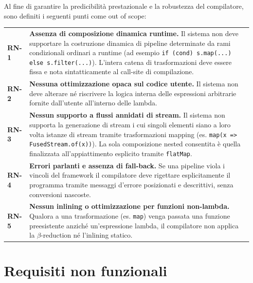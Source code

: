 \documentclass[a4paper,11pt]{report}
\theoremstyle{definition}
\begin{document}
Al fine di garantire la predicibilità prestazionale e la robustezza del compilatore, sono definiti i seguenti punti come out of scope:

\begin{longtable}{@{}p{}p{}@{}}
  \textbf{RN-1} &
  \textbf{Assenza di composizione dinamica runtime.}
  Il sistema non deve supportare la costruzione dinamica di pipeline determinate da rami condizionali ordinari a runtime (ad esempio \texttt{if (cond) s.map(...) else s.filter(...)}). L'intera catena di trasformazioni deve essere fissa e nota sintatticamente al call-site di compilazione.
  \\[0.5em]

  \textbf{RN-2} &
  \textbf{Nessuna ottimizzazione opaca sul codice utente.}
  Il sistema non deve alterare né riscrivere la logica interna delle espressioni arbitrarie fornite dall'utente all'interno delle lambda.
  \\[0.5em]

  \textbf{RN-3} &
  \textbf{Nessun supporto a flussi annidati di stream.}
  Il sistema non supporta la generazione di stream i cui singoli elementi siano a loro volta istanze di stream tramite trasformazioni mapping (es. \texttt{map(x => FusedStream.of(x))}). La sola composizione nested consentita è quella finalizzata all'appiattimento esplicito tramite \texttt{flatMap}.
  \\[0.5em]

  \textbf{RN-4} &
  \textbf{Errori parlanti e assenza di fall-back.}
  Se una pipeline viola i vincoli del framework il compilatore deve rigettare esplicitamente il programma tramite messaggi d'errore posizionati e descrittivi, senza conversioni nascoste.
  \\[0.5em]

  \textbf{RN-5} &
  \textbf{Nessun inlining o ottimizzazione per funzioni non-lambda.}
  Qualora a una trasformazione (es. \texttt{map}) venga passata una funzione preesistente anziché un'espressione lambda, il compilatore non applica la $\beta$-reduction né l'inlining statico.
\end{longtable}

\section{Requisiti non funzionali}
\end{document}
